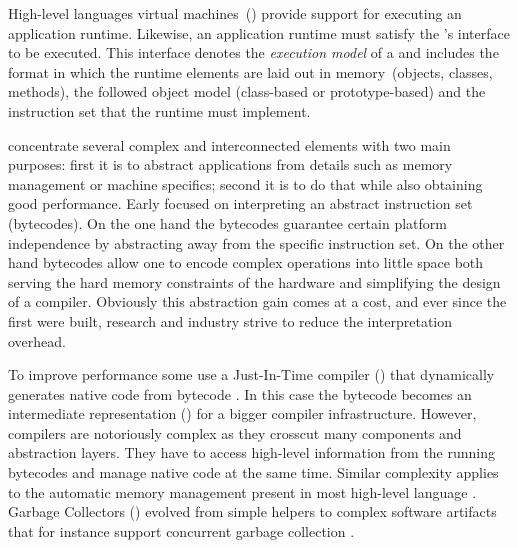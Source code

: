 High-level languages virtual machines~(\VMs) provide support for executing an application runtime.
Likewise, an application runtime must satisfy the \VM's interface to be executed.
This interface denotes the \emph{execution model} of a \VM and includes the format in which the runtime elements are laid out in memory~(objects, classes, methods), the followed object model (\eg class-based or prototype-based) and the instruction set that the runtime must implement.

\VMs concentrate several complex and interconnected elements with two main purposes: first it is to abstract applications from details such as memory management or machine specifics; second it is to do that while also obtaining good performance.
Early \VMs focused on interpreting an abstract instruction set (bytecodes).
On the one hand the bytecodes guarantee certain platform independence by abstracting away from the \CPU specific instruction set.
On the other hand bytecodes allow one to encode complex operations into little space both serving the hard memory constraints of the hardware and simplifying the design of a compiler.
Obviously this abstraction gain comes at a cost, and ever since the first \VMs were built, research and industry strive to reduce the interpretation overhead.


To improve performance some \VMs use a Just-In-Time compiler (\JIT) that dynamically generates native code from bytecode \cite{Deut84a}.
In this case the bytecode becomes an intermediate representation (\IR) for a bigger compiler infrastructure.
However, \JIT compilers are notoriously complex as they crosscut many \VM components and abstraction layers. They have to access high-level information from the running bytecodes and manage native code at the same time.
Similar complexity applies to the automatic memory management present in most high-level language \VMs.
Garbage Collectors (\GC) evolved from simple helpers to complex software artifacts that for instance support concurrent garbage collection \cite{Clic05a}.


